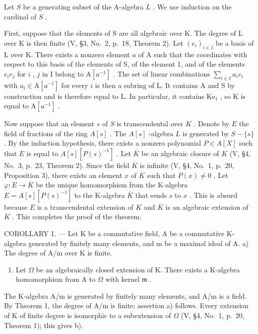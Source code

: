 Let \(S\) be a generating subset of the A-algebra \(L\) . We use induction on the cardinal of \(S\) .

First, suppose that the elements of S are all algebraic over K. The degree of L over K is then finite (V, §3, No.~2, p.~18, Theorem 2). Let \((e_i)_{i\in I}\) be a basis of L over K. There exists a nonzero element \(a\) of A such that the coordinates with respect to this basis of the elements of S, of the element 1, and of the elements \(e_i e_j\) for \(i\) , \(j\) in I belong to \(\mathrm{A}[a^{-1}]\) . The set of linear combinations \(\sum_{i\in I}a_i e_i\) with \(a_i\in \mathrm{A}[a^{-1}]\) for every \(i\) is then a subring of L. It contains A and S by construction and is therefore equal to L. In particular, it contains \(\mathrm{Ke}_1\) , so K is equal to \(\mathrm{A}[a^{-1}]\) .

Now suppose that an element \(s\) of \(S\) is transcendental over \(K\) . Denote by \(E\) the field of fractions of the ring \(A[s]\) . The \(A[s]\) -algebra \(L\) is generated by \(S - \{s\}\) . By the induction hypothesis, there exists a nonzero polynomial \(P \in A[X]\) such that \(E\) is equal to \(A[s][P(s)^{-1}]\) . Let \(\overline{K}\) be an algebraic closure of \(K\) (V, §4, No.~3, p.~23, Theorem 2). Since the field \(\overline{K}\) is infinite (V, §4, No.~1, p.~20, Proposition 3), there exists an element \(x\) of \(\overline{K}\) such that \(P(x) \neq 0\) . Let \(\varphi : E \to \overline{K}\) be the unique homomorphism from the K-algebra \(E = A[s][P(s)^{-1}]\) to the K-algebra \(\overline{K}\) that sends \(s\) to \(x\) . This is absurd because \(E\) is a transcendental extension of \(K\) and \(\overline{K}\) is an algebraic extension of \(K\) . This completes the proof of the theorem.

COROLLARY 1. --- Let K be a commutative field, A be a commutative K-algebra generated by finitely many elements, and m be a maximal ideal of A. a) The degree of A/m over K is finite.

\begin{enumerate}
\def\labelenumi{\alph{enumi})}
\setcounter{enumi}{1}
\tightlist
\item
  Let \(\Omega\) be an algebraically closed extension of K. There exists a K-algebra homomorphism from A to \(\Omega\) with kernel \(\mathfrak{m}\) .
\end{enumerate}

The K-algebra A/m is generated by finitely many elements, and A/m is a field. By Theorem 1, the degree of A/m is finite; assertion a) follows. Every extension of K of finite degree is isomorphic to a subextension of \(\Omega\) (V, §4, No.~1, p.~20, Theorem 1); this gives b).

